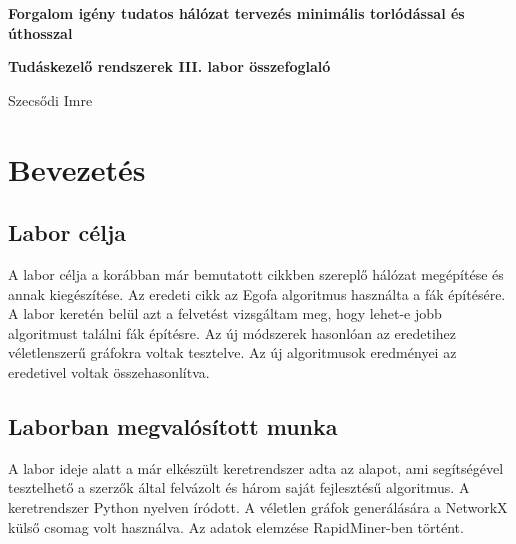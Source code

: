\documentclass[12pt]{report}
\begin{document}
\begin{titlepage}
	\begin{center}
		\vspace*{1cm}
		
		\textbf{\LARGE 
			Forgalom igény tudatos hálózat tervezés minimális torlódással és úthosszal
		}
	
	
		\vspace{0.5cm}
	
		\textbf{\normalsize Tudáskezelő rendszerek III. labor összefoglaló}
		
		\vfill
		
		\Large Szecsődi Imre
		
		\vspace{2.8cm}
		
		\the\year
		
	\end{center}
\end{titlepage}

\tableofcontents
	
\chapter{Bevezetés}


\section{Labor célja}

A labor célja a korábban már bemutatott cikkben\cite{avin_demand-aware_nodate} szereplő hálózat megépítése és annak kiegészítése.
Az eredeti cikk az Egofa algoritmus használta a fák építésére. 
A labor keretén belül azt a felvetést vizsgáltam meg, hogy lehet-e jobb algoritmust találni fák építésre.  
Az új módszerek hasonlóan az eredetihez véletlenszerű gráfokra voltak tesztelve.
Az új algoritmusok eredményei az eredetivel voltak összehasonlítva.

\section{Laborban megvalósított munka}

A labor ideje alatt a már elkészült keretrendszer adta az alapot, ami segítségével tesztelhető a szerzők által felvázolt és három saját fejlesztésű algoritmus.
A keretrendszer Python \cite{noauthor_python_nodate} nyelven íródott.
A véletlen gráfok generálására a NetworkX külső csomag volt használva\cite{noauthor_networkx_nodate}.
Az adatok elemzése RapidMiner-ben történt\cite{noauthor_lightning_nodate}.
\end{document}
